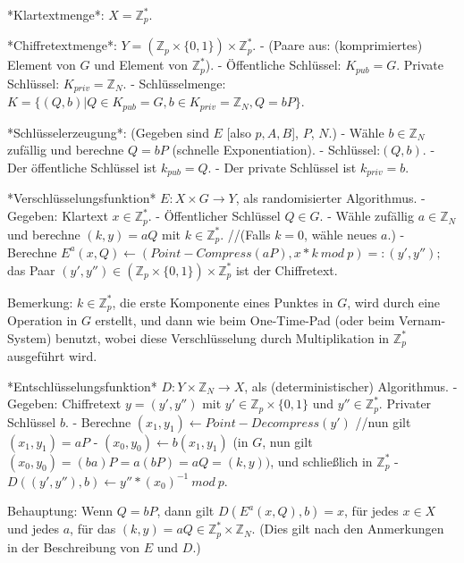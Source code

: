 \documentclass[a4paper]{article}
\begin{document}
\begin{multicols}{3}
    *Klartextmenge*: $X=\mathbb{Z}^*_p$.

    *Chiffretextmenge*: $Y=(\mathbb{Z}_p \times\{0,1\})\times\mathbb{Z}^*_p$.
    - (Paare aus: (komprimiertes) Element von $G$ und Element von $\mathbb{Z}^*_p$).
    - Öffentliche Schlüssel: $K_{pub}=G$. Private Schlüssel: $K_{priv}=\mathbb{Z}_N$.
    - Schlüsselmenge: $K=\{(Q,b)|Q\in K_{pub} = G,b\in K_{priv} =\mathbb{Z}_N,Q=bP\}$.

    *Schlüsselerzeugung*: (Gegeben sind $E$ [also $p,A,B$], $P$, $N$.)
    - Wähle $b\in\mathbb{Z}_N$ zufällig und berechne $Q=bP$ (schnelle Exponentiation).
    - Schlüssel:$(Q,b)$.
    - Der öffentliche Schlüssel ist $k_{pub}=Q$.
    - Der private Schlüssel ist $k_{priv}=b$.

    *Verschlüsselungsfunktion* $E:X\times G\rightarrow Y$, als randomisierter Algorithmus.
    - Gegeben: Klartext $x\in\mathbb{Z}^*_p$.
    - Öffentlicher Schlüssel $Q\in G$.
    - Wähle zufällig $a\in\mathbb{Z}_N$ und berechne $(k,y) =aQ$ mit $k\in\mathbb{Z}^*_p$. //(Falls $k=0$, wähle neues $a$.)
    - Berechne $E^a (x,Q)\leftarrow (Point-Compress(aP),x*k\ mod\ p) =: (y',y'');$ das Paar $(y',y'')\in(\mathbb{Z}_p\times\{0,1\})\times\mathbb{Z}^*_p$ ist der Chiffretext.

    Bemerkung: $k\in\mathbb{Z}^*_p$, die erste Komponente eines Punktes in $G$, wird durch eine Operation in $G$ erstellt, und dann wie beim One-Time-Pad (oder beim Vernam-System) benutzt, wobei diese Verschlüsselung durch Multiplikation in $\mathbb{Z}^*_p$ ausgeführt wird.

    *Entschlüsselungsfunktion* $D:Y\times\mathbb{Z}_N \rightarrow X$, als (deterministischer) Algorithmus.
    - Gegeben: Chiffretext $y=(y',y'')$ mit $y'\in\mathbb{Z}_p\times\{0,1\}$ und $y''\in\mathbb{Z}^*_p$. Privater Schlüssel $b$.
    - Berechne $(x_1,y_1)\leftarrow Point-Decompress (y')$ //nun gilt $(x_1,y_1) =aP$
    - $(x_0,y_0)\leftarrow b(x_1,y_1)$ (in $G$, nun gilt $(x_0,y_0) = (ba)P=a(bP) =aQ= (k,y))$, und schließlich in $\mathbb{Z}^*_p$
    - $D((y',y''),b)\leftarrow y''*(x_0)^{-1}\ mod\ p$.

    Behauptung: Wenn $Q=bP$, dann gilt $D(E^a (x,Q),b) =x$, für jedes $x\in X$ und jedes $a$, für das $(k,y) =aQ\in\mathbb{Z}^*_p \times\mathbb{Z}_N$. (Dies gilt nach den Anmerkungen in der Beschreibung von $E$ und $D$.)

\end{multicols}
\end{document}
